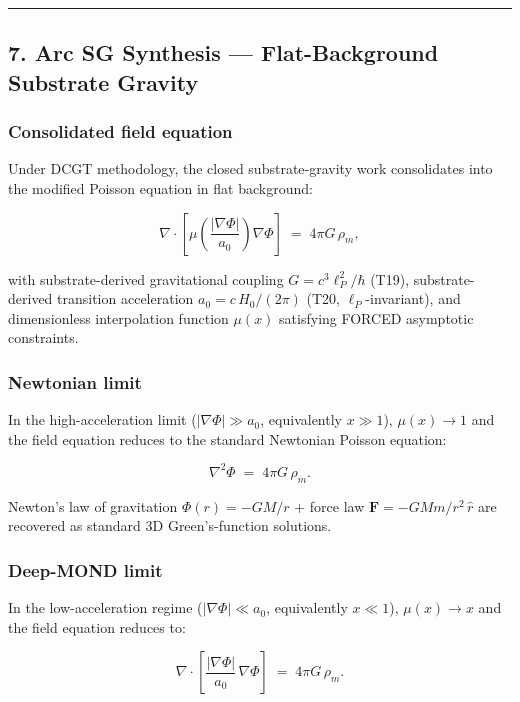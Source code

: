 \documentclass[
]{article}
\begin{document}
\begin{center}\rule{0.5\linewidth}{0.5pt}\end{center}

\subsection{7. Arc SG Synthesis --- Flat-Background Substrate
Gravity}\label{arc-sg-synthesis-flat-background-substrate-gravity}

\subsubsection{Consolidated field
equation}\label{consolidated-field-equation}

Under DCGT methodology, the closed substrate-gravity work consolidates
into the modified Poisson equation in flat background:

\[\boxed{\;\nabla\cdot\!\left[\mu\!\left(\frac{|\nabla\Phi|}{a_0}\right)\nabla\Phi\right] \;=\; 4\pi G\,\rho_m,\;}\]

with substrate-derived gravitational coupling \(G = c^3\ell_P^2/\hbar\)
(T19), substrate-derived transition acceleration \(a_0 = c\,H_0/(2\pi)\)
(T20, \(\ell_P\)-invariant), and dimensionless interpolation function
\(\mu(x)\) satisfying FORCED asymptotic constraints.

\subsubsection{Newtonian limit}\label{newtonian-limit}

In the high-acceleration limit (\(|\nabla\Phi| \gg a_0\), equivalently
\(x \gg 1\)), \(\mu(x) \to 1\) and the field equation reduces to the
standard Newtonian Poisson equation:

\[\nabla^2\Phi \;=\; 4\pi G\,\rho_m.\]

Newton's law of gravitation \(\Phi(r) = -GM/r\) + force law
\(\mathbf{F} = -GMm/r^2\,\hat r\) are recovered as standard 3D
Green's-function solutions.

\subsubsection{Deep-MOND limit}\label{deep-mond-limit}

In the low-acceleration regime (\(|\nabla\Phi| \ll a_0\), equivalently
\(x \ll 1\)), \(\mu(x) \to x\) and the field equation reduces to:

\[\nabla\cdot\!\left[\frac{|\nabla\Phi|}{a_0}\,\nabla\Phi\right] \;=\; 4\pi G\,\rho_m.\]
\end{document}
